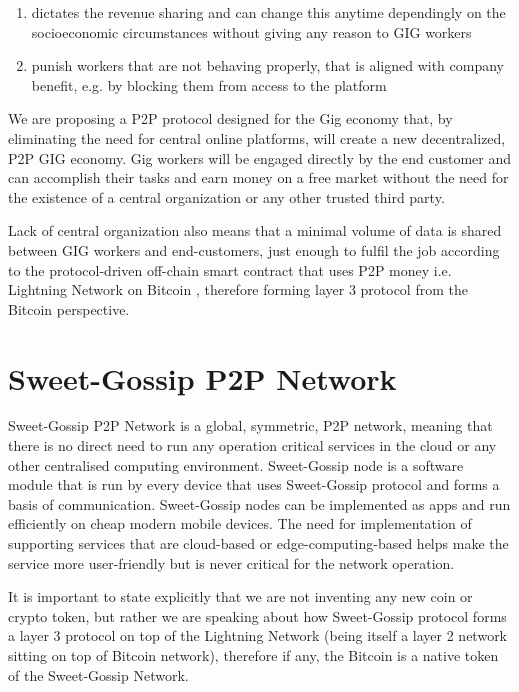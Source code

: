 \documentclass{article}
\begin{document}
\begin{enumerate}
\item dictates the revenue sharing and can change this anytime dependingly on the socioeconomic circumstances without giving any reason to GIG workers

\item punish workers that are not behaving properly, that is aligned with company benefit, e.g. by blocking them from access to the platform
\end{enumerate}

We are proposing a P2P protocol designed for the Gig economy that, by eliminating the need for central online platforms, will create a new decentralized, P2P GIG economy. Gig workers will be engaged directly by the end customer and can accomplish their tasks and earn money on a free market without the need for the existence of a central organization or any other trusted third party.

Lack of central organization also means that a minimal volume of data is shared between GIG workers and end-customers, just enough to fulfil the job according to the protocol-driven off-chain smart contract that uses P2P money i.e. Lightning Network \cite{poon2016bitcoin} on Bitcoin \cite{nakamoto2009bitcoin}, therefore forming layer 3 protocol from the Bitcoin perspective.

\section{Sweet-Gossip P2P Network}
Sweet-Gossip P2P Network is a global, symmetric, P2P network, meaning that there is no direct need to run any operation critical services in the cloud or any other centralised computing environment. Sweet-Gossip node is a software module that is run by every device that uses Sweet-Gossip protocol and forms a basis of communication. Sweet-Gossip nodes can be implemented as apps and run efficiently on cheap modern mobile devices. The need for implementation of supporting services that are cloud-based or edge-computing-based helps make the service more user-friendly but is never critical for the network operation.

It is important to state explicitly that we are not inventing any new coin or crypto token, but rather we are speaking about how Sweet-Gossip protocol forms a layer 3 protocol on top of the Lightning Network (being itself a layer 2 network sitting on top of Bitcoin network), therefore if any, the Bitcoin is a native token of the Sweet-Gossip Network.
\end{document}
